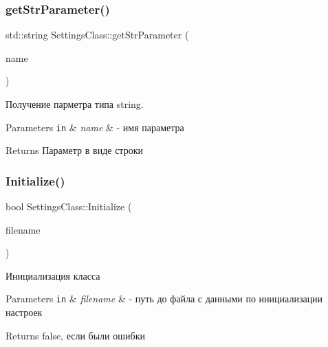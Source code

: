\subsubsection{\texorpdfstring{get\+Str\+Parameter()}{getStrParameter()}}
{\footnotesize\ttfamily std\+::string Settings\+Class\+::get\+Str\+Parameter (\begin{DoxyParamCaption}\item[{const std\+::string \&}]{name }\end{DoxyParamCaption})}



Получение парметра типа string. 


\begin{DoxyParams}[1]{Parameters}
\mbox{\tt in}  & {\em name} & -\/ имя параметра \\
\hline
\end{DoxyParams}
\begin{DoxyReturn}{Returns}
Параметр в виде строки 
\end{DoxyReturn}
\mbox{\label{class_settings_class_a83f3762c91a0be60d3f00041ce98f67a}} 
\subsubsection{\texorpdfstring{Initialize()}{Initialize()}}
{\footnotesize\ttfamily bool Settings\+Class\+::\+Initialize (\begin{DoxyParamCaption}\item[{\hyperlink{class_path_class}{Path\+Class} $\ast$}]{filename }\end{DoxyParamCaption})}



Инициализация класса 


\begin{DoxyParams}[1]{Parameters}
\mbox{\tt in}  & {\em filename} & -\/ путь до файла с данными по инициализации настроек \\
\hline
\end{DoxyParams}
\begin{DoxyReturn}{Returns}
false, если были ошибки 
\end{DoxyReturn}
\mbox{\label{class_settings_class_a310b7327477778d8289439d62312b6ad}} 
